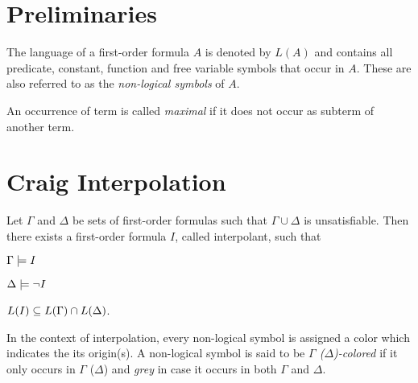 \section{Preliminaries}

The language of a first-order formula $A$ is denoted by $L(A)$ and contains all predicate, constant, function and free variable symbols that occur in $A$.
These are also referred to as the \emph{non-logical symbols} of $A$.

An occurrence of term is called \emph{maximal} if it does not occur as subterm of another term.

\section{Craig Interpolation}


\begin{samepage}
	\begin{thm}[Interpolation]
		\label{thm:interpolation}
		Let $\Gamma$ and $\Delta$ be sets of first-order formulas such that $ \Gamma \cup \Delta $ is unsatisfiable.
		Then there exists a first-order formula $I$, called interpolant, such that \nopagebreak[4]
		\begin{compactenum}
		\item $ \Gamma \models I$ \label{int_1}
		\item $ \Delta \models \lnot I$  \label{int_2}
		\item $ L(I) \subseteq L(\Gamma) \cap L(\Delta)$.  \label{int_3}
			\thmqed
		\end{compactenum}
	\end{thm}
\end{samepage}

In the context of interpolation, every non-logical symbol is assigned a color which indicates the its origin(s). 
A non-logical symbol is said to be \emph{$\Gamma$ ($\Delta$)-colored} if it only occurs in $\Gamma$ ($\Delta$) and \emph{grey} in case it occurs in both $\Gamma$ and $\Delta$.
